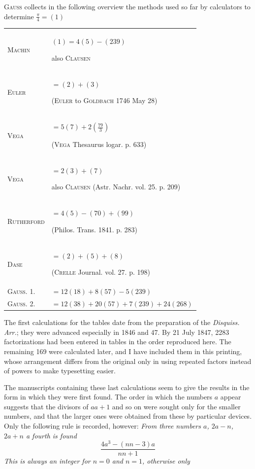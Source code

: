 \par \textsc{Gauss} collects in the following overview the methods used so far by calculators to determine $\frac{\pi}{4}=(1)$
\begingroup\fontsize{10}{13}\selectfont\setlength{\tabcolsep}{3pt}
\begin{longtable}{@{}l p{.74\linewidth}@{}}
\textsc{Machin} & $(1)=4(5)-(239)$\par also \textsc{Clausen} \\[3pt]
\textsc{Euler} & ${}=(2)+(3)$\par (\textsc{Euler} to \textsc{Goldbach} 1746 May 28) \\[3pt]
\textsc{Vega} & ${}=5(7)+2(\frac{79}{3})$\par (\textsc{Vega} Thesaurus logar. p. 633) \\[3pt]
\textsc{Vega} & ${}=2(3)+(7)$\par also \textsc{Clausen} (Astr. Nachr. vol. 25. p. 209) \\[3pt]
\textsc{Rutherford} & ${}=4(5)-(70)+(99)$\par (Philos. Trans. 1841. p. 283) \\[3pt]
\textsc{Dase} & ${}=(2)+(5)+(8)$\par (\textsc{Crelle} Journal. vol. 27. p. 198) \\[3pt]
\textsc{Gauss}. 1. & ${}=12(18)+8(57)-5(239)$ \\[3pt]
\textsc{Gauss}. 2. & ${}=12(38)+20(57)+7(239)+24(268)$ \\[3pt]
\end{longtable}\endgroup
\par The first calculations for the tables date from the preparation of the \textit{Disquiss. Arr.}; they were advanced especially in 1846 and 47. By 21 July 1847, 2283 factorizations had been entered in tables in the order reproduced here. The remaining 169 were calculated later, and I have included them in this printing, whose arrangement differs from the original only in using repeated factors instead of powers to make typesetting easier.
\par The manuscripts containing these last calculations seem to give the results in the form in which they were first found. The order in which the numbers $a$ appear suggests that the divisors of $aa+1$ and so on were sought only for the smaller numbers, and that the larger ones were obtained from these by particular devices. Only the following rule is recorded, however: \textit{From three numbers $a$, $2a-n$, $2a+n$ a fourth is found}
\[
\frac{4a^3-(nn-3)a}{nn+1}
\]
\textit{This is always an integer for $n=0$ and $n=1$, otherwise only}
